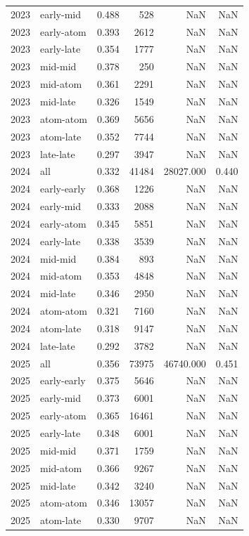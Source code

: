 \begin{table}
\begin{tabular}{rlrrrr}
2023 & early-mid & 0.488 & 528 & NaN & NaN \\
2023 & early-atom & 0.393 & 2612 & NaN & NaN \\
2023 & early-late & 0.354 & 1777 & NaN & NaN \\
2023 & mid-mid & 0.378 & 250 & NaN & NaN \\
2023 & mid-atom & 0.361 & 2291 & NaN & NaN \\
2023 & mid-late & 0.326 & 1549 & NaN & NaN \\
2023 & atom-atom & 0.369 & 5656 & NaN & NaN \\
2023 & atom-late & 0.352 & 7744 & NaN & NaN \\
2023 & late-late & 0.297 & 3947 & NaN & NaN \\
2024 & all & 0.332 & 41484 & 28027.000 & 0.440 \\
2024 & early-early & 0.368 & 1226 & NaN & NaN \\
2024 & early-mid & 0.333 & 2088 & NaN & NaN \\
2024 & early-atom & 0.345 & 5851 & NaN & NaN \\
2024 & early-late & 0.338 & 3539 & NaN & NaN \\
2024 & mid-mid & 0.384 & 893 & NaN & NaN \\
2024 & mid-atom & 0.353 & 4848 & NaN & NaN \\
2024 & mid-late & 0.346 & 2950 & NaN & NaN \\
2024 & atom-atom & 0.321 & 7160 & NaN & NaN \\
2024 & atom-late & 0.318 & 9147 & NaN & NaN \\
2024 & late-late & 0.292 & 3782 & NaN & NaN \\
2025 & all & 0.356 & 73975 & 46740.000 & 0.451 \\
2025 & early-early & 0.375 & 5646 & NaN & NaN \\
2025 & early-mid & 0.373 & 6001 & NaN & NaN \\
2025 & early-atom & 0.365 & 16461 & NaN & NaN \\
2025 & early-late & 0.348 & 6001 & NaN & NaN \\
2025 & mid-mid & 0.371 & 1759 & NaN & NaN \\
2025 & mid-atom & 0.366 & 9267 & NaN & NaN \\
2025 & mid-late & 0.342 & 3240 & NaN & NaN \\
2025 & atom-atom & 0.346 & 13057 & NaN & NaN \\
2025 & atom-late & 0.330 & 9707 & NaN & NaN \\

\end{tabular}
\end{table}
